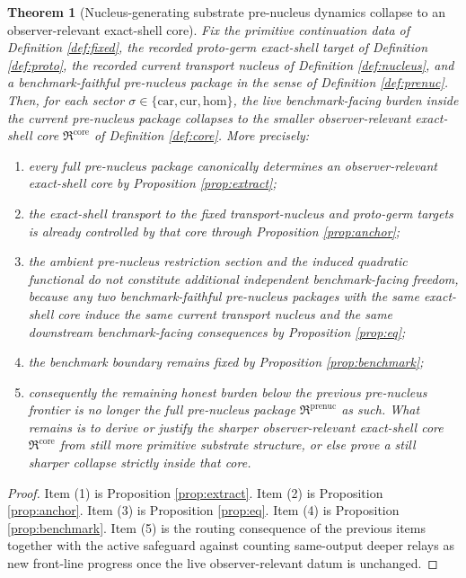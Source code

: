 \documentclass[11pt]{article}
\newcommand{\Car}{\mathrm{car}}
\newcommand{\Cur}{\mathrm{cur}}
\newcommand{\Hom}{\mathrm{hom}}
\newcommand{\PreNucPackage}{\mathfrak R^{\mathrm{prenuc}}}
\newcommand{\PreNucCore}{\mathfrak R^{\mathrm{core}}}
\newtheorem{theorem}{Theorem}
\begin{document}
\begin{theorem}[Nucleus-generating substrate pre-nucleus dynamics collapse to an observer-relevant exact-shell core]
\label{thm:main}
Fix the primitive continuation data of Definition \ref{def:fixed}, the recorded proto-germ exact-shell target of Definition \ref{def:proto}, the recorded current transport nucleus of Definition \ref{def:nucleus}, and a benchmark-faithful pre-nucleus package in the sense of Definition \ref{def:prenuc}. Then, for each sector \(\sigma\in\{\Car,\Cur,\Hom\}\), the live benchmark-facing burden inside the current pre-nucleus package collapses to the smaller observer-relevant exact-shell core \(\PreNucCore\) of Definition \ref{def:core}. More precisely:
\begin{enumerate}
    \item every full pre-nucleus package canonically determines an observer-relevant exact-shell core by Proposition \ref{prop:extract};
    \item the exact-shell transport to the fixed transport-nucleus and proto-germ targets is already controlled by that core through Proposition \ref{prop:anchor};
    \item the ambient pre-nucleus restriction section and the induced quadratic functional do not constitute additional independent benchmark-facing freedom, because any two benchmark-faithful pre-nucleus packages with the same exact-shell core induce the same current transport nucleus and the same downstream benchmark-facing consequences by Proposition \ref{prop:eq};
    \item the benchmark boundary remains fixed by Proposition \ref{prop:benchmark};
    \item consequently the remaining honest burden below the previous pre-nucleus frontier is no longer the full pre-nucleus package \(\PreNucPackage\) as such. What remains is to derive or justify the sharper observer-relevant exact-shell core \(\PreNucCore\) from still more primitive substrate structure, or else prove a still sharper collapse strictly inside that core.
\end{enumerate}
\end{theorem}

\begin{proof}
Item (1) is Proposition \ref{prop:extract}. Item (2) is Proposition \ref{prop:anchor}. Item (3) is Proposition \ref{prop:eq}. Item (4) is Proposition \ref{prop:benchmark}. Item (5) is the routing consequence of the previous items together with the active safeguard against counting same-output deeper relays as new front-line progress once the live observer-relevant datum is unchanged.
\end{proof}
\end{document}

